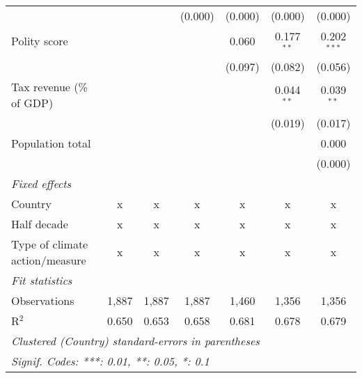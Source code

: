 \begin{tabular}{lcccccc}
                                                                               &         &               & (0.000)        & (0.000)        & (0.000)        & (0.000)\\   
   Polity score                                                                &         &               &                & 0.060          & 0.177$^{**}$   & 0.202$^{***}$\\   
                                                                               &         &               &                & (0.097)        & (0.082)        & (0.056)\\   
   Tax revenue (\% of GDP)                                                     &         &               &                &                & 0.044$^{**}$   & 0.039$^{**}$\\   
                                                                               &         &               &                &                & (0.019)        & (0.017)\\   
   Population total                                                            &         &               &                &                &                & 0.000\\   
                                                                               &         &               &                &                &                & (0.000)\\   
   \emph{Fixed effects}\\
   Country                                                                     & x       & x             & x              & x              & x              & x\\  
   Half decade                                                                 & x       & x             & x              & x              & x              & x\\  
   Type of climate action/measure                                              & x       & x             & x              & x              & x              & x\\  
   \midrule \emph{Fit statistics}\\
   Observations                                                                & 1,887   & 1,887         & 1,887          & 1,460          & 1,356          & 1,356\\  
   R$^2$                                                                       & 0.650   & 0.653         & 0.658          & 0.681          & 0.678          & 0.679\\  
   \midrule
   \multicolumn{7}{l}{\emph{Clustered (Country) standard-errors in parentheses}}\\
   \multicolumn{7}{l}{\emph{Signif. Codes: ***: 0.01, **: 0.05, *: 0.1}}\\
\end{tabular}
\par\endgroup


